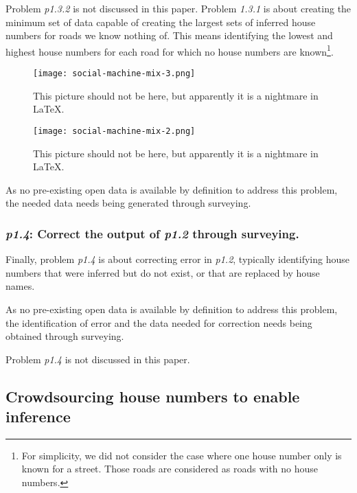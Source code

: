         Problem {\it p1.3.2} is not discussed in this paper. Problem {\it 1.3.1} is about creating the minimum set of data capable of creating the largest sets of inferred house numbers for roads we know nothing of. This means identifying the lowest and highest house numbers for each road for which no house numbers are known\footnote{For simplicity, we did not consider the case where one house number only is known for a street. Those roads are considered as roads with no house numbers.}.

        \begin{figure*}
        	\texttt{[image: social-machine-mix-3.png]}
        	\caption{This picture should not be here, but apparently it is a nightmare in LaTeX.}
        	\label{fig:social_machine_mix_3}
        \end{figure*}
        
        \begin{figure*}
        	\texttt{[image: social-machine-mix-2.png]}
        	\caption{This picture should not be here, but apparently it is a nightmare in LaTeX.}
        	\label{fig:social_machine_mix_2}
        \end{figure*}
        
        As no pre-existing open data is available by definition to address this problem, the needed data needs being generated through surveying. 

    \subsubsection{{\it p1.4}: Correct the output of {\it p1.2} through surveying.} 

        Finally, problem {\it p1.4} is about correcting error in {\it p1.2}, typically identifying house numbers that were inferred but do not exist, or that are replaced by house names.
        
        As no pre-existing open data is available by definition to address this problem, the identification of error and the data needed for correction needs being obtained through surveying. 

        Problem {\it p1.4} is not discussed in this paper.

\subsection{Crowdsourcing house numbers to enable inference}

